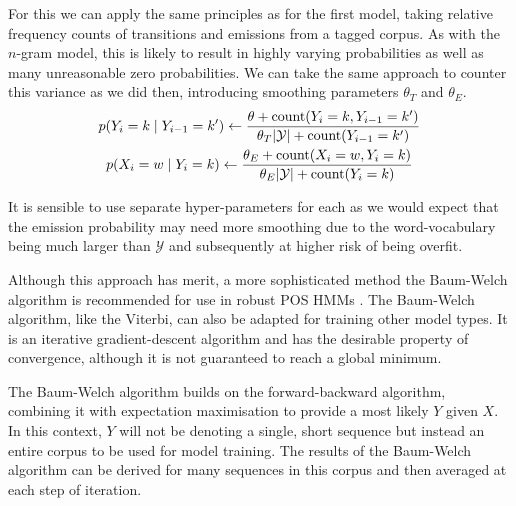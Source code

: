 \documentclass[../main.tex]{subfiles}
\begin{document}
For this we can apply the same principles as for the first model, taking relative frequency counts of transitions and emissions from a tagged corpus.
As with the $n$-gram model, this is likely to result in highly varying probabilities as well as many unreasonable zero probabilities.
We can take the same approach to counter this variance as we did then, introducing smoothing parameters $\theta_T$ and $\theta_E$.
\begin{gather*}
    p (Y_i = k \mid Y_{i-1} = k') \gets \frac{\theta + \operatorname{count} (Y_i = k ,  Y_{i-1} = k')}{\theta_T |\mathcal{Y}| + \operatorname{count} (Y_{i-1} = k')} \\
    p (X_i = w \mid Y_i = k) \gets \frac{\theta_E + \operatorname{count} (X_i = w ,  Y_i = k)}{\theta_E |\mathcal{Y}| + \operatorname{count} (Y_i = k)}
\end{gather*}

It is sensible to use separate hyper-parameters for each as we would expect that the emission probability may need more smoothing due to the word-vocabulary being much larger than $\mathcal{Y}$ and subsequently at higher risk of being overfit.

Although this approach has merit, a more sophisticated method the Baum-Welch algorithm \autocite{baum-1972-alg} is recommended for use in robust POS HMMs \autocite{kupiec-1992-hmm}.
The Baum-Welch algorithm, like the Viterbi, can also be adapted for training other model types.
It is an iterative gradient-descent algorithm and has the desirable property of convergence, although it is not guaranteed to reach a global minimum.

The Baum-Welch algorithm builds on the forward-backward algorithm, combining it with expectation maximisation to provide a most likely $Y$ given $X$.
In this context, $Y$ will not be denoting a single, short sequence but instead an entire corpus to be used for model training. The results of the Baum-Welch algorithm can be derived for many sequences in this corpus and then averaged at each step of iteration.
\end{document}
